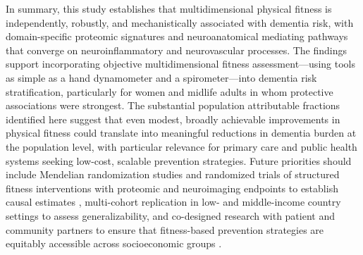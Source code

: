 \documentclass{article}
\begin{document}

In summary, this study establishes that multidimensional physical fitness 
is independently, robustly, and mechanistically associated with dementia 
risk, with domain-specific proteomic signatures and neuroanatomical 
mediating pathways that converge on neuroinflammatory and neurovascular 
processes. The findings support incorporating objective multidimensional 
fitness assessment—using tools as simple as a hand dynamometer and a 
spirometer—into dementia risk stratification, particularly for women and 
midlife adults in whom protective associations were strongest. The 
substantial population attributable fractions identified here suggest 
that even modest, broadly achievable improvements in physical fitness 
could translate into meaningful reductions in dementia burden at the 
population level, with particular relevance for primary care and public 
health systems seeking low-cost, scalable prevention strategies. Future 
priorities should include Mendelian randomization studies 
\citep{smith2003mendelian} and randomized trials of structured fitness 
interventions with proteomic and neuroimaging endpoints to establish 
causal estimates \citep{northey2018exercise}, multi-cohort replication 
in low- and middle-income country settings to assess generalizability, 
and co-designed research with patient and community partners to ensure 
that fitness-based prevention strategies are equitably accessible across 
socioeconomic groups \citep{pratt2018community}.
\end{document}
